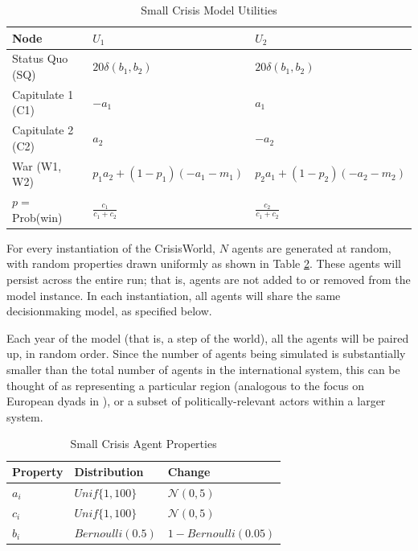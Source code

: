\begin{table}[h!]
\centering
  \caption{Small Crisis Model Utilities}
  \label{table:smallcrisis_utils}
\begin{tabular}{lll}
	\hline
	Node 			& $U_1$ 		& $U_2$ \\
	\hline
	Status Quo (SQ)  	& $20\delta(b_1,b_2)$			&	$20\delta(b_1,b_2)$			\\
	Capitulate 1 (C1)	& $-a_1$						& $a_1$							\\
	Capitulate 2 (C2) 	& $a_2$							& $-a_2$						\\
	War 		 (W1, W2)	& $p_1a_2 + (1-p_1)(-a_1-m_1)$  & $p_2a_1 + (1-p_2)(-a_2-m_2)$	\\
	\hline
	$p=$Prob(win)	& $\frac{c_1}{c_1+c_2}$ 	   	& $\frac{c_2}{c_1+c_2}$			\\
	\hline
\end{tabular}
\tableSpace
\end{table}

For every instantiation of the CrisisWorld, $N$ agents are generated at random, with random properties drawn uniformly as shown in Table \ref{table:agent_properties}. These agents will persist across the entire run; that is, agents are not added to or removed from the model instance. In each instantiation, all agents will share the same decisionmaking model, as specified below.

Each year of the model (that is, a step of the world), all the agents will be paired up, in random order. Since the number of agents being simulated is substantially smaller than the total number of agents in the international system, this can be thought of as representing a particular region (analogous to the focus on European dyads in \citet{bdm_1992}), or a subset of politically-relevant actors within a larger system.

\begin{table}[]
\centering
	\caption{Small Crisis Agent Properties}
  	\label{table:agent_properties}
\begin{tabular}{lll}
	\hline
	Property & Distribution 	 & Change  	 \\
	\hline
	$a_i$	 &	$Unif\{1, 100\}$ & $\mathcal{N}(0, 5)$   \\
	$c_i$	 &	$Unif\{1, 100\}$ & $\mathcal{N}(0, 5)$	 \\
	$b_i$	 &	$Bernoulli(0.5)$ & $1 - Bernoulli(0.05)$ \\
	\hline
\end{tabular}
\tableSpace
\end{table}

